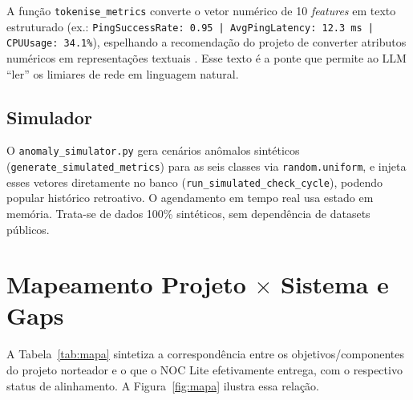 \documentclass[12pt,a4paper]{article}
\begin{document}
A função \texttt{tokenise\_metrics} converte o vetor numérico de 10 \textit{
features} em texto estruturado (ex.: \texttt{PingSuccessRate: 0.95 |
AvgPingLatency: 12.3 ms | CPUUsage: 34.1\%}), espelhando a recomendação do
projeto de converter atributos numéricos em representações textuais
\cite{rA616}\cite{rA431}\cite{rA432}. Esse texto é a ponte que permite ao LLM ``ler'' os limiares
de rede em linguagem natural.

\subsection{Simulador}
\label{sec:sim}

O \texttt{anomaly\_simulator.py} gera cenários anômalos sintéticos
(\texttt{generate\_simulated\_metrics}) para as seis classes via
\texttt{random.uniform}, e injeta esses vetores diretamente no banco
(\texttt{run\_simulated\_check\_cycle}), podendo popular histórico retroativo.
O agendamento em tempo real usa estado em memória. Trata-se de dados 100\%
sintéticos, sem dependência de datasets públicos.

\section{Mapeamento Projeto $\times$ Sistema e Gaps}
\label{sec:mapeamento}

A Tabela~\ref{tab:mapa} sintetiza a correspondência entre os objetivos/componentes
do projeto norteador \cite{rRODRIGUES} e o que o NOC Lite efetivamente entrega, com
o respectivo status de alinhamento. A Figura~\ref{fig:mapa} ilustra essa
relação.
\end{document}
